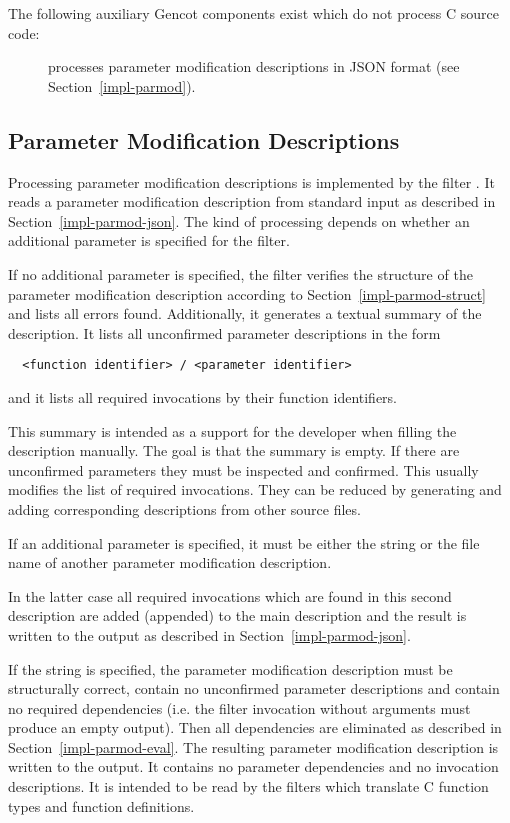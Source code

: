 The following auxiliary Gencot components exist which do not process C source code:
\begin{description}
\item[] processes parameter modification descriptions in JSON format (see Section~\ref{impl-parmod}).
\end{description}

\subsection{Parameter Modification Descriptions}

Processing parameter modification descriptions is implemented by the filter . It reads a parameter
modification description from standard input as described in Section~\ref{impl-parmod-json}. The kind of processing
depends on whether an additional parameter is specified for the filter.

If no additional parameter is specified, the filter verifies the structure of the parameter modification description 
according to Section~\ref{impl-parmod-struct} and lists all errors found.
Additionally, it generates a textual summary of the description. It lists
all unconfirmed parameter descriptions in the form
\begin{verbatim}
  <function identifier> / <parameter identifier>
\end{verbatim}
and it lists all required invocations by their function identifiers.

This summary is intended as a support for the developer when filling the description manually. The goal is that
the summary is empty. If there are unconfirmed parameters they must be inspected and confirmed. This usually 
modifies the list of required invocations. They can be reduced by generating and adding corresponding descriptions
from other source files.

If an additional parameter is specified, it must be either the string  or the file name of another 
parameter modification description.

In the latter case all required invocations which are found in this second description are added (appended) to the main 
description and the result is written to the output as described in Section~\ref{impl-parmod-json}.

If the string  is specified, the parameter modification description must be structurally correct, contain no
unconfirmed parameter descriptions and contain no required dependencies (i.e. the filter invocation without arguments
must produce an empty output). Then all dependencies are eliminated as described in Section~\ref{impl-parmod-eval}.
The resulting parameter modification description is written to the output. It contains no parameter dependencies and
no invocation descriptions. It is intended to be read by the filters which translate C function types and function 
definitions.

